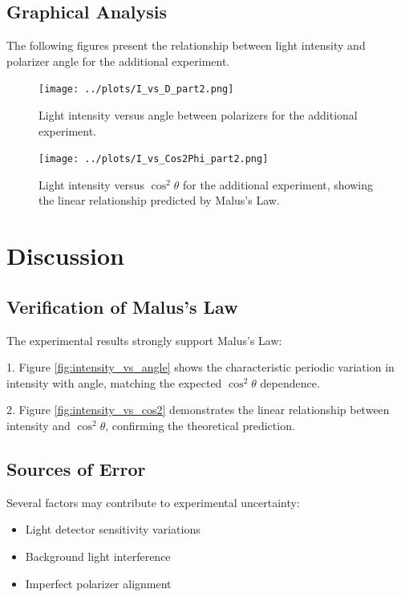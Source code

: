 \documentclass[journal]{IEEEtran}
\begin{document}
\subsection{Graphical Analysis}
The following figures present the relationship between light intensity and polarizer angle for the additional experiment.

\begin{figure}[H]
    \centering
    \texttt{[image: ../plots/I\_vs\_D\_part2.png]}
    \caption{Light intensity versus angle between polarizers for the additional experiment.}
    \label{fig:intensity_vs_angle_part2}
\end{figure}

\begin{figure}[H]
    \centering
    \texttt{[image: ../plots/I\_vs\_Cos2Phi\_part2.png]}
    \caption{Light intensity versus $\cos^2\theta$ for the additional experiment, showing the linear relationship predicted by Malus's Law.}
    \label{fig:intensity_vs_cos2_part2}
\end{figure}

\section{Discussion}

\subsection{Verification of Malus's Law}
The experimental results strongly support Malus's Law:

1. Figure \ref{fig:intensity_vs_angle} shows the characteristic periodic variation in intensity with angle, matching the expected $\cos^2\theta$ dependence.

2. Figure \ref{fig:intensity_vs_cos2} demonstrates the linear relationship between intensity and $\cos^2\theta$, confirming the theoretical prediction.

\subsection{Sources of Error}
Several factors may contribute to experimental uncertainty:
\begin{itemize}
    \item Light detector sensitivity variations
    \item Background light interference
    \item Imperfect polarizer alignment
\end{itemize}
\end{document}
